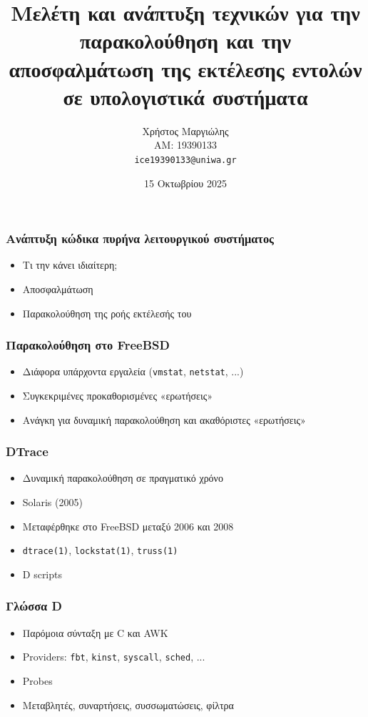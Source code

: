 \documentclass{beamer}
\title{Μελέτη και ανάπτυξη τεχνικών για την παρακολούθηση και την αποσφαλμάτωση
της εκτέλεσης εντολών σε υπολογιστικά συστήματα}
\author{Χρήστος Μαργιώλης \\ ΑΜ: 19390133 \\ \lstinline{ice19390133@uniwa.gr}}
\date{15 Οκτωβρίου 2025}
\begin{document}
\maketitle

\begin{frame}
\frametitle{Ανάπτυξη κώδικα πυρήνα λειτουργικού συστήματος}

\begin{itemize}
	\item Τι την κάνει ιδιαίτερη;
	\item Αποσφαλμάτωση
	\item Παρακολούθηση της ροής εκτέλεσής του
\end{itemize}

\end{frame}

\begin{frame}
\frametitle{Παρακολούθηση στο FreeBSD}

\begin{itemize}
	\item Διάφορα υπάρχοντα εργαλεία (\lstinline{vmstat},
		\lstinline{netstat}, ...)
	\item Συγκεκριμένες προκαθορισμένες «ερωτήσεις»
	\item Ανάγκη για δυναμική παρακολούθηση και ακαθόριστες «ερωτήσεις»
\end{itemize}

\end{frame}

\begin{frame}
\frametitle{DTrace}

\begin{itemize}
	\item Δυναμική παρακολούθηση σε πραγματικό χρόνο
	\item Solaris (2005)
	\item Μεταφέρθηκε στο FreeBSD μεταξύ 2006 και 2008
	\item \lstinline{dtrace(1)}, \lstinline{lockstat(1)}, \lstinline{truss(1)}
	\item D scripts
\end{itemize}

\end{frame}

\begin{frame}
\frametitle{Γλώσσα D}

\begin{itemize}
	\item Παρόμοια σύνταξη με C και AWK
	\item Providers: \lstinline{fbt}, \lstinline{kinst},
		\lstinline{syscall}, \lstinline{sched}, ...
	\item Probes
	\item Μεταβλητές, συναρτήσεις, συσσωματώσεις, φίλτρα
\end{itemize}

\end{frame}
\end{document}
